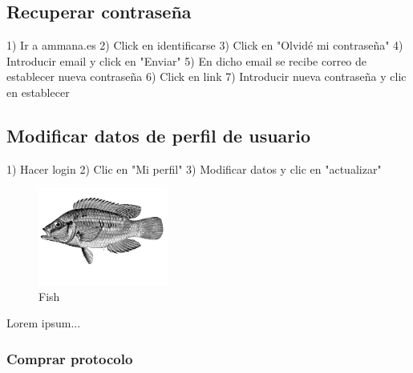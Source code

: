 \documentclass[12pt, spanish]{article}
\begin{document}

    \subsection{Recuperar contraseña}

    1) Ir a ammana.es
    2) Click en identificarse
    3) Click en "Olvidé mi contraseña"
    4) Introducir email y click en "Enviar"
    5) En dicho email se recibe correo de establecer nueva contraseña
    6) Click en link
    7) Introducir nueva contraseña y clic en establecer


    \subsection{Modificar datos de perfil de usuario}

    1) Hacer login
    2) Clic en "Mi perfil"
    3) Modificar datos y clic en "actualizar"
    \begin{figure} %
      \begin{center}
        \includegraphics[width=0.38\textwidth]{fish}
      \end{center}
      \caption{Fish}
    \end{figure}
    Lorem ipsum...


    \subsubsection{Comprar protocolo}
\end{document}
